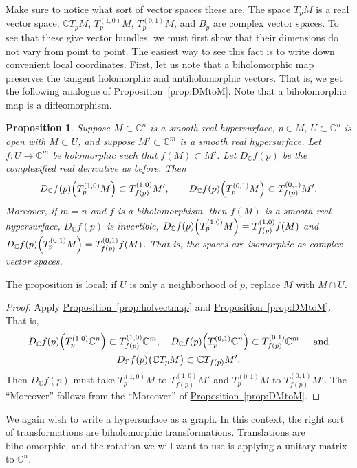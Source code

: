 \documentclass[12pt,openany]{book}
\newcommand{\avoidbreak}{\postdisplaypenalty=100}
\newcommand{\C}{{\mathbb{C}}}
\theoremstyle{plain}
\newtheorem{prop}[thm]{Proposition}
\theoremstyle{remark}
\theoremstyle{definition}
\theoremstyle{exercise}
\theoremstyle{example}
\newcommand{\propref}[1]{\hyperref[#1]{Proposition~\ref*{#1}}}
\begin{document}
Make sure to notice what sort of vector spaces these are.
The space $T_pM$ is a real vector space;
$\C T_pM$, $T_p^{(1,0)}M$, $T_p^{(0,1)} M$, and $B_p$
are complex vector spaces.
To see that these give vector bundles,
we must first show that their dimensions do not vary
from point to point.  The easiest way to see this fact is to write down
convenient local coordinates.  First, let us note that
a biholomorphic map preserves the tangent holomorphic and antiholomorphic
vectors.  That is, we get the following
analogue of \propref{prop:DMtoM}.
Note that a biholomorphic map is a diffeomorphism.

\begin{prop} \label{prop:whereTgoeshol}
Suppose $M \subset \C^n$ is a smooth real hypersurface, $p \in M$,
$U \subset \C^n$ is open with $M \subset U$, and suppose $M' \subset
\C^m$ is a smooth real hypersurface.
Let $f \colon U \to \C^m$ be holomorphic such that $f(M) \subset M'$.
Let $D_\C f(p)$ be
the complexified real derivative as before.  Then
\begin{equation*}
D_\C f(p)\Bigl(T_p^{(1,0)}M\Bigr) \subset T_{f(p)}^{(1,0)}M', \qquad
D_\C f(p)\Bigl(T_p^{(0,1)}M\Bigr) \subset T_{f(p)}^{(0,1)}M'.
\avoidbreak
\end{equation*}
Moreover, if $m=n$ and $f$ is a biholomorphism,
then $f(M)$ is a smooth real hypersurface,
$D_\C f(p)$ is invertible,
$D_\C f(p)\Bigl(T_p^{(1,0)}M\Bigr) = T_{f(p)}^{(1,0)} f(M)$
and
$D_\C f(p)\Bigl(T_p^{(0,1)}M\Bigr) = T_{f(p)}^{(0,1)} f(M)$.
That is, the spaces are isomorphic as complex vector spaces.
\end{prop}

The proposition is local; if $U$ is only a neighborhood of $p$,
replace $M$ with $M \cap U$.

\begin{proof}
Apply \propref{prop:holvectmap} and
\propref{prop:DMtoM}.
That is,
\begin{multline*}
D_\C f(p)\Bigl(T_p^{(1,0)}\C^n\Bigr) \subset T_{f(p)}^{(1,0)}\C^m, \quad
D_\C f(p)\Bigl(T_p^{(0,1)}\C^n\Bigr) \subset T_{f(p)}^{(0,1)}\C^m, \quad
\text{and} \\
D_\C f(p)\bigl(\C T_pM\bigr) \subset \C T_{f(p)}M' .
\avoidbreak
\end{multline*}
Then $D_\C f(p)$ must take
$T_p^{(1,0)}M$ to $T_{f(p)}^{(1,0)}M'$ and
$T_p^{(0,1)}M$ to $T_{f(p)}^{(0,1)}M'$.
The ``Moreover'' follows
from the ``Moreover'' of \propref{prop:DMtoM}.
\end{proof}

We again wish to write a hypersurface as a graph.  In this context, the
right sort of transformations are biholomorphic transformations.
Translations are biholomorphic, and
the rotation we will want to use is applying a unitary matrix to $\C^n$.
\end{document}
